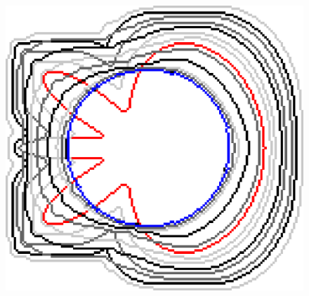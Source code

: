\begin{figure}[!h]
\begin{minipage}[b]{0.5\textwidth}
	\includegraphics[scale=0.25]{figures/chapter5/exhaustive-selection/ii-r5-lp0.01/flower/summary.pdf}\\[2em]		
	

\end{minipage}
\end{figure}
